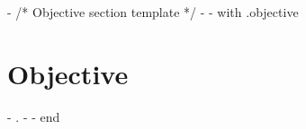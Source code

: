 {{- /* Objective section template */ -}}
{{- with .objective}}
\section{Objective}
\small{ {{- . -}} }
\vspace{-4pt}
{{- end}}
